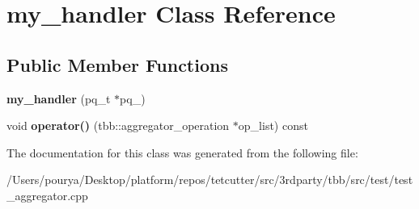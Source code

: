 \hypertarget{classmy__handler}{}\section{my\+\_\+handler Class Reference}
\label{classmy__handler}
\subsection*{Public Member Functions}
\begin{DoxyCompactItemize}
\item 
\hypertarget{classmy__handler_a927a4c0f3923b4d7f646d1eab7965959}{}{\bfseries my\+\_\+handler} (pq\+\_\+t $\ast$pq\+\_\+)\label{classmy__handler_a927a4c0f3923b4d7f646d1eab7965959}

\item 
\hypertarget{classmy__handler_aee22c77ddf13fe153a63233d7b05a4ee}{}void {\bfseries operator()} (tbb\+::aggregator\+\_\+operation $\ast$op\+\_\+list) const \label{classmy__handler_aee22c77ddf13fe153a63233d7b05a4ee}

\end{DoxyCompactItemize}


The documentation for this class was generated from the following file\+:\begin{DoxyCompactItemize}
\item 
/\+Users/pourya/\+Desktop/platform/repos/tetcutter/src/3rdparty/tbb/src/test/test\+\_\+aggregator.\+cpp\end{DoxyCompactItemize}
